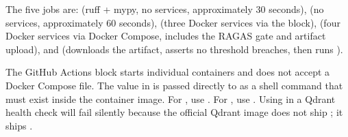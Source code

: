 The five jobs are:  (ruff + mypy, no services, approximately
30 seconds),  (no services, approximately 60 seconds),
 (three Docker services via the 
block),  (four Docker services via Docker Compose, includes
the RAGAS gate and artifact upload), and  (downloads the
artifact, asserts no threshold breaches, then runs ).

\begin{warningbox}
The GitHub Actions  block starts individual containers
and does not accept a Docker Compose file.
The  value in  is passed directly to
 as a shell command that must exist inside the
container image.
For , use .
For , use .
Using  in a Qdrant health check will fail silently because
the official Qdrant image does not ship ; it ships .
\end{warningbox}

